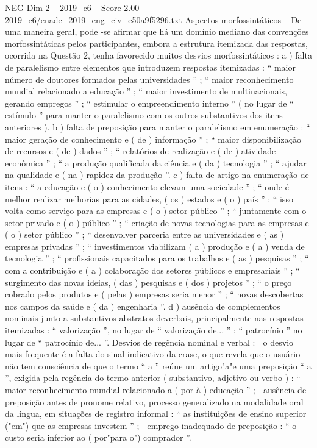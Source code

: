 \begin{textsample}{NEG Dim 2 – 2019\_c6 – Score 2.00 – 2019\_c6/enade\_2019\_eng\_civ\_e50a9f5296.txt}
Aspectos morfossintáticos – De uma maneira geral, pode -se afirmar que há um domínio mediano das convenções morfossintáticas pelos participantes, embora a estrutura itemizada das respostas, ocorrida na Questão 2, tenha favorecido muitos desvios morfossintáticos : a ) falta de paralelismo entre elementos que introduzem respostas itemizadas : “ maior número de doutores formados pelas universidades ” ; “ maior reconhecimento mundial relacionado a educação ” ; “ maior investimento de multinacionais, gerando empregos ” ; “ estimular o empreendimento interno ” ( no lugar de “ estímulo ” para manter o paralelismo com os outros substantivos dos itens anteriores ). b ) falta de preposição para manter o paralelismo em enumeração : “ maior geração de conhecimento e ( de ) informação ” ; “ maior disponibilização de recursos e ( de ) dados ” ; “ relatórios de realização e ( de ) atividade econômica ” ; “ a produção qualificada da ciência e ( da ) tecnologia ” ; “ ajudar na qualidade e ( na ) rapidez da produção ”. c ) falta de artigo na enumeração de itens : “ a educação e ( o ) conhecimento elevam uma sociedade ” ; “ onde é melhor realizar melhorias para as cidades, ( os ) estados e ( o ) país ” ; “ isso volta como serviço para as empresas e ( o ) setor público ” ; “ juntamente com o setor privado e ( o ) público ” ; “ criação de novas tecnologias para as empresas e ( o ) setor público ” ; “ desenvolver parceria entre as universidades e ( as ) empresas privadas ” ; “ investimentos viabilizam ( a ) produção e ( a ) venda de tecnologia ” ; “ profissionais capacitados para os trabalhos e ( as ) pesquisas ” ; “ com a contribuição e ( a ) colaboração dos setores públicos e empresariais ” ; “ surgimento das novas ideias, ( das ) pesquisas e ( dos ) projetos ” ; “ o preço cobrado pelos produtos e ( pelas ) empresas seria menor ” ; “ novas descobertas nos campos da saúde e ( da ) engenharia ”. d ) ausência de complementos nominais junto a substantivos abstratos deverbais, principalmente nas respostas itemizadas : “ valorização ”, no lugar de “ valorização de... ” ; “ patrocínio ” no lugar de “ patrocínio de... ”.
Desvios de regência nominal e verbal :  o desvio mais frequente é a falta do sinal indicativo da crase, o que revela que o usuário não tem consciência de que o termo “ a ” reúne um artigo"a"e uma preposição “ a ”, exigida pela regência do termo anterior ( substantivo, adjetivo ou verbo ) : “ maior reconhecimento mundial relacionado a ( por à ) educação ” ;  ausência de preposição antes de pronome relativo, processo generalizado na modalidade oral da língua, em situações de registro informal : “ as instituições de ensino superior ("em") que as empresas investem ” ;  emprego inadequado de preposição : “ o custo seria inferior ao ( por"para o") comprador ”.

\end{textsample}
